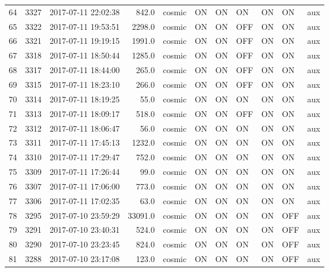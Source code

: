 \begin{longtable}{lrlrlllllll}
64  &  3327 &  2017-07-11 22:02:38 &     842.0 &   cosmic &  ON &   ON &   ON &  ON &   ON &       aux\\
65  &  3322 &  2017-07-11 19:53:51 &    2298.0 &   cosmic &  ON &   ON &  OFF &  ON &   ON &       aux\\
66  &  3321 &  2017-07-11 19:19:15 &    1991.0 &   cosmic &  ON &   ON &  OFF &  ON &   ON &       aux\\
67  &  3318 &  2017-07-11 18:50:44 &    1285.0 &   cosmic &  ON &   ON &  OFF &  ON &   ON &       aux\\
68  &  3317 &  2017-07-11 18:44:00 &     265.0 &   cosmic &  ON &   ON &  OFF &  ON &   ON &       aux\\
69  &  3315 &  2017-07-11 18:23:10 &     266.0 &   cosmic &  ON &   ON &  OFF &  ON &   ON &       aux\\
70  &  3314 &  2017-07-11 18:19:25 &      55.0 &   cosmic &  ON &   ON &   ON &  ON &   ON &       aux\\
71  &  3313 &  2017-07-11 18:09:17 &     518.0 &   cosmic &  ON &   ON &  OFF &  ON &   ON &       aux\\
72  &  3312 &  2017-07-11 18:06:47 &      56.0 &   cosmic &  ON &   ON &   ON &  ON &   ON &       aux\\
73  &  3311 &  2017-07-11 17:45:13 &    1232.0 &   cosmic &  ON &   ON &   ON &  ON &   ON &       aux\\
74  &  3310 &  2017-07-11 17:29:47 &     752.0 &   cosmic &  ON &   ON &   ON &  ON &   ON &       aux\\
75  &  3309 &  2017-07-11 17:26:44 &      99.0 &   cosmic &  ON &   ON &   ON &  ON &   ON &       aux\\
76  &  3307 &  2017-07-11 17:06:00 &     773.0 &   cosmic &  ON &   ON &   ON &  ON &   ON &       aux\\
77  &  3306 &  2017-07-11 17:02:35 &      63.0 &   cosmic &  ON &   ON &   ON &  ON &   ON &       aux\\
78  &  3295 &  2017-07-10 23:59:29 &   33091.0 &   cosmic &  ON &   ON &   ON &  ON &  OFF &       aux\\
79  &  3291 &  2017-07-10 23:40:31 &     524.0 &   cosmic &  ON &   ON &   ON &  ON &  OFF &       aux\\
80  &  3290 &  2017-07-10 23:23:45 &     824.0 &   cosmic &  ON &   ON &   ON &  ON &  OFF &       aux\\
81  &  3288 &  2017-07-10 23:17:08 &     123.0 &   cosmic &  ON &   ON &   ON &  ON &  OFF &       aux\\

\end{longtable}
